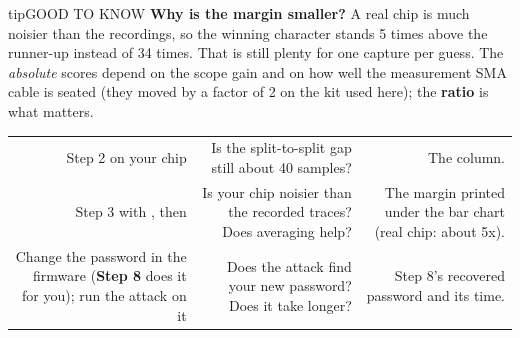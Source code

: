 \documentclass[11pt,letterpaper]{article}
\begin{document}
\vspace{4pt}

\begin{guidecallout}{tip}{GOOD TO KNOW}
\textbf{Why is the margin smaller?} A real chip is much noisier than the recordings, so the winning character stands 5
times above the runner-up instead of 34 times. That is still plenty for one capture per guess. The \emph{absolute}
scores depend on the scope gain and on how well the measurement SMA cable is seated (they moved by a factor of 2 on
the kit used here); the \textbf{ratio} is what matters.
\end{guidecallout}





{\small{}
\begin{longtable}{|R{0.3768}|R{0.3043}|R{0.3188}|}
\hline
{} &  &  \\ \hline
\endhead
Step 2 on your chip & Is the split-to-split gap still about 40 samples? & The  column. \\ \hline
Step 3 with , then  & Is your chip noisier than the recorded traces? Does averaging help? & The margin printed under the bar chart (real chip: about 5x). \\ \hline
Change the password in the firmware (\textbf{Step 8} does it for you); run the attack on it & Does the attack find your new password? Does it take longer? & Step 8's recovered password and its time. \\ \hline
\end{longtable}}

\vspace{4pt}
\end{document}
